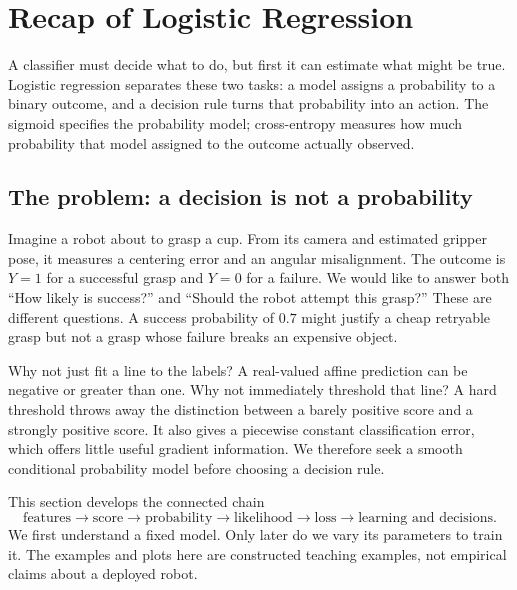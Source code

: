 \section{Recap of Logistic Regression}
\label{sec:logreg_to_mlp:recap_of_logistic_regression}

\begin{keyidea}
A classifier must decide what to do, but first it can estimate what might be true.
Logistic regression separates these two tasks: a model assigns a probability to a
binary outcome, and a decision rule turns that probability into an action.
The sigmoid specifies the probability model; cross-entropy measures how much
probability that model assigned to the outcome actually observed.
\end{keyidea}

\subsection{The problem: a decision is not a probability}
Imagine a robot about to grasp a cup. From its camera and estimated gripper pose,
it measures a centering error and an angular misalignment. The outcome is
$Y=1$ for a successful grasp and $Y=0$ for a failure. We would like to answer
both ``How likely is success?'' and ``Should the robot attempt this grasp?''
These are different questions. A success probability of $0.7$ might justify a
cheap retryable grasp but not a grasp whose failure breaks an expensive object.

Why not just fit a line to the labels? A real-valued affine prediction can be
negative or greater than one. Why not immediately threshold that line? A hard
threshold throws away the distinction between a barely positive score and a
strongly positive score. It also gives a piecewise constant classification error,
which offers little useful gradient information. We therefore seek a smooth
conditional probability model before choosing a decision rule.

This section develops the connected chain
\[
\text{features}\longrightarrow\text{score}\longrightarrow\text{probability}
\longrightarrow\text{likelihood}\longrightarrow\text{loss}
\longrightarrow\text{learning and decisions}.
\]
We first understand a fixed model. Only later do we vary its parameters to train
it. The examples and plots here are constructed teaching examples, not empirical
claims about a deployed robot.

